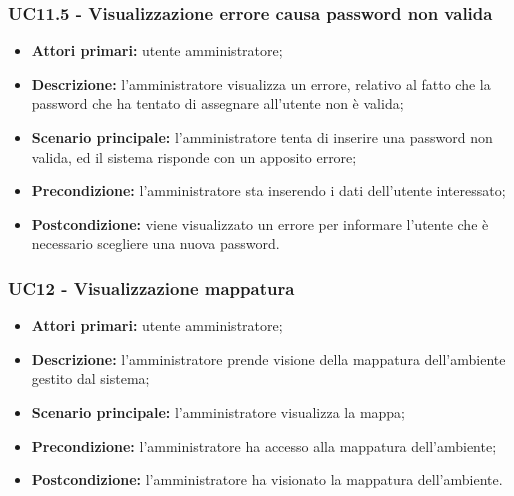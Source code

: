 \subsubsection{UC11.5 - Visualizzazione errore causa password non valida}
	\begin{itemize}
		\item \textbf{Attori primari:} utente amministratore;
		\item \textbf{Descrizione:} l'amministratore visualizza un errore, relativo al fatto che la password che ha tentato di assegnare all'utente non è valida;
		\item \textbf{Scenario principale:} l'amministratore tenta di inserire una password non valida, ed il sistema risponde con un apposito errore;
		\item \textbf{Precondizione:} l'amministratore sta inserendo i dati dell'utente interessato;
		\item \textbf{Postcondizione:} viene visualizzato un errore per informare l'utente che è necessario scegliere una nuova password.
	\end{itemize}


\subsubsection{UC12 - Visualizzazione mappatura}
	\begin{itemize}
		\item \textbf{Attori primari:} utente amministratore;
		\item \textbf{Descrizione:} l'amministratore prende visione della mappatura dell'ambiente gestito dal sistema;
		\item \textbf{Scenario principale:} l'amministratore visualizza la mappa;
		\item \textbf{Precondizione:} l'amministratore ha accesso alla mappatura dell'ambiente;
		\item \textbf{Postcondizione:} l'amministratore ha visionato la mappatura dell'ambiente.
	\end{itemize}

